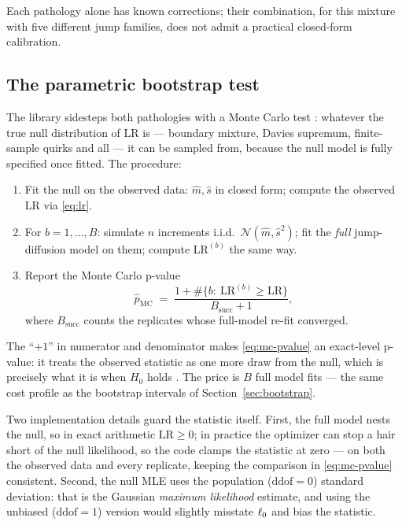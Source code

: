 Each pathology alone has known corrections; their combination, for this
mixture with five different jump families, does not admit a practical
closed-form calibration.

\subsection{The parametric bootstrap test}

\begin{decision}
\label{dec:bootstrap-test}
The library sidesteps both pathologies with a Monte Carlo test
\citep{DavisonHinkley1997}: whatever the true null distribution of
$\mathrm{LR}$ is --- boundary mixture, Davies supremum, finite-sample
quirks and all --- it can be sampled from, because the null model is fully
specified once fitted. The procedure:
\begin{enumerate}
  \item Fit the null on the observed data: $\hat m, \hat s$ in closed
        form; compute the observed $\mathrm{LR}$ via \eqref{eq:lr}.
  \item For $b = 1, \dots, B$: simulate $n$ increments i.i.d.\
        $\mathcal N(\hat m, \hat s^2)$; fit the \emph{full} jump-diffusion
        model on them; compute $\mathrm{LR}^{(b)}$ the same way.
  \item Report the Monte Carlo p-value
        \begin{equation}
          \hat p_{\mathrm{MC}}
          \;=\;
          \frac{1 + \#\{ b :\ \mathrm{LR}^{(b)} \ge \mathrm{LR} \}}
               {B_{\mathrm{succ}} + 1},
          \label{eq:mc-pvalue}
        \end{equation}
        where $B_{\mathrm{succ}}$ counts the replicates whose full-model
        re-fit converged.
\end{enumerate}
The ``$+1$'' in numerator and denominator makes \eqref{eq:mc-pvalue} an
exact-level p-value: it treats the observed statistic as one more draw
from the null, which is precisely what it is when $H_0$ holds
\citep{DavisonHinkley1997}. The price is $B$ full model fits --- the same
cost profile as the bootstrap intervals of Section~\ref{sec:bootstrap}.
\end{decision}

Two implementation details guard the statistic itself. First, the full
model nests the null, so in exact arithmetic $\mathrm{LR} \ge 0$; in
practice the optimizer can stop a hair short of the null likelihood, so
the code clamps the statistic at zero --- on both the observed data and
every replicate, keeping the comparison in \eqref{eq:mc-pvalue}
consistent. Second, the null MLE uses the population ($\mathrm{ddof}=0$)
standard deviation: that is the Gaussian \emph{maximum likelihood}
estimate, and using the unbiased ($\mathrm{ddof}=1$) version would
slightly misstate $\ell_0$ and bias the statistic.

